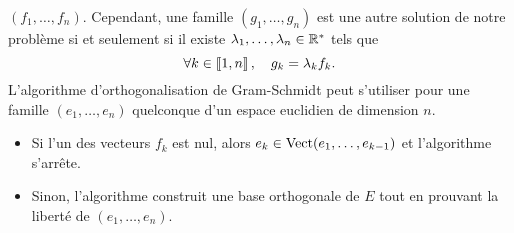 \documentclass{magnolia}
\begin{document}
\begin{remarques}
  $(f_1,\ldots,f_n)$. Cependant, une famille $(g_1,\ldots,g_n)$ est une autre solution
  de notre problème si et seulement si il existe $\lambda_1,\ldots,\lambda_n\in{\mathbb{R}^*}$ tels
  que
  \[\forall k\in\left\llbracket 1,n\right\rrbracket,\quad g_k=\lambda_k f_k.\]
\remarque L'algorithme d'orthogonalisation de Gram-Schmidt peut s'utiliser pour une
  famille $(e_1,\ldots,e_n)$ quelconque d'un espace euclidien de dimension $n$.
  \begin{itemize}
  \item Si l'un des vecteurs $f_k$ est nul, alors $e_k \in\operatorname{Vect}(e_1,\ldots,e_{k-1})$
    et l'algorithme s'arrête.
  \item Sinon, l'algorithme construit une base orthogonale de $E$ tout en prouvant
    la liberté de $(e_1,\ldots,e_n)$.
  \end{itemize}

\end{remarques}
\end{document}
